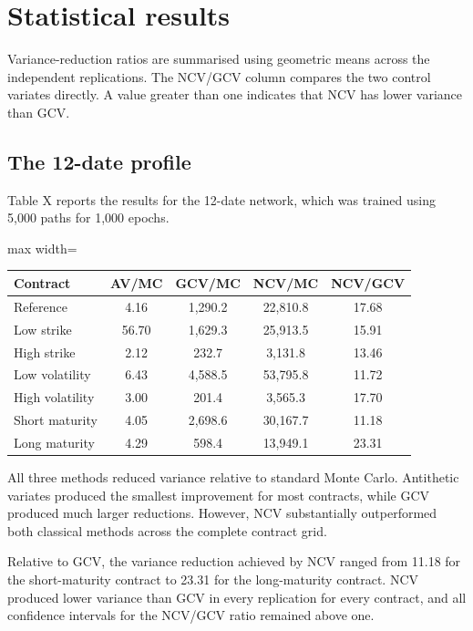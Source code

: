 \section{Statistical results}

Variance-reduction ratios are summarised using geometric means across the independent replications. The NCV/GCV column compares the two control variates directly. A value greater than one indicates that NCV has lower variance than GCV.

\subsection{The 12-date profile}

Table X reports the results for the 12-date network, which was trained using 5,000 paths for 1,000 epochs.

\begin{table}[h]
\centering
\begin{adjustbox}{max width=\textwidth}
\begin{tabular}{lcccc}
\hline
Contract & AV/MC & GCV/MC & NCV/MC & NCV/GCV \\
\hline
Reference & 4.16 & 1,290.2 & 22,810.8 & 17.68 \\
Low strike & 56.70 & 1,629.3 & 25,913.5 & 15.91 \\
High strike & 2.12 & 232.7 & 3,131.8 & 13.46 \\
Low volatility & 6.43 & 4,588.5 & 53,795.8 & 11.72 \\
High volatility & 3.00 & 201.4 & 3,565.3 & 17.70 \\
Short maturity & 4.05 & 2,698.6 & 30,167.7 & 11.18 \\
Long maturity & 4.29 & 598.4 & 13,949.1 & 23.31 \\
\hline
\end{tabular}
\end{adjustbox}
\end{table}

All three methods reduced variance relative to standard Monte Carlo. Antithetic variates produced the smallest improvement for most contracts, while GCV produced much larger reductions. However, NCV substantially outperformed both classical methods across the complete contract grid.

Relative to GCV, the variance reduction achieved by NCV ranged from 11.18 for the short-maturity contract to 23.31 for the long-maturity contract. NCV produced lower variance than GCV in every replication for every contract, and all confidence intervals for the NCV/GCV ratio remained above one.

